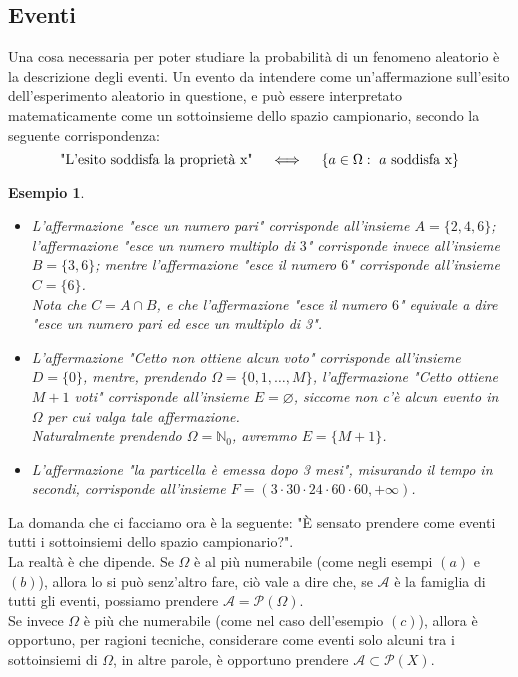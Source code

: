 \documentclass[11pt]{book}
\theoremstyle{Definizione}
\theoremstyle{TeoremaProposizioneLemmaCorollario}
\theoremstyle{OsservazioneNota}
\newtheorem{myes}{Esempio}[section]
\newcommand{\N}{\mathbb{N}}
\newcommand{\parti}[1]{\mathcal{P}\left({#1}\right)}
\begin{document}
\subsection{Eventi}
Una cosa necessaria per poter studiare la probabilità di un fenomeno aleatorio è la descrizione degli eventi. Un evento da intendere come un'affermazione sull'esito dell'esperimento aleatorio in questione, e può essere interpretato matematicamente come un sottoinsieme dello spazio campionario, secondo la seguente corrispondenza:
$$
\textup{"L'esito soddisfa la proprietà x"}\quad \iff \quad \{a\in \Omega:\ a\textup{ soddisfa x}\}
$$
\begin{myes}\hfill
\begin{itemize}
\item[$(a)$] L'affermazione "esce un numero pari" corrisponde all'insieme $A = \{2,4,6\}$; l'affermazione "esce un numero multiplo di $3$" corrisponde invece all'insieme $B = \{3,6\}$; mentre l'affermazione "esce il numero $6$" corrisponde all'insieme $C = \{6\}$.\\
Nota che $C = A\cap B$, e che l'affermazione "esce il numero $6$" equivale a dire "esce un numero pari ed esce un multiplo di 3".
\item[$(b)$] L'affermazione "Cetto non ottiene alcun voto" corrisponde all'insieme $D = \{0\}$, mentre, prendendo $\Omega = \{0,1,\dots,M\}$, l'affermazione "Cetto ottiene $M+1$ voti" corrisponde all'insieme $E = \varnothing$, siccome non c'è alcun evento in $\Omega$ per cui valga tale affermazione.\\
Naturalmente prendendo $\Omega = \N_0$, avremmo $E = \{M+1\}$.
\item[$(c)$] L'affermazione "la particella è emessa dopo 3 mesi", misurando il tempo in secondi, corrisponde all'insieme $F = (3\cdot 30 \cdot 24 \cdot 60 \cdot 60, +\infty)$.
\end{itemize}
\end{myes}
La domanda che ci facciamo ora è la seguente: "È sensato prendere come eventi tutti i sottoinsiemi dello spazio campionario?".\\
La realtà è che dipende. Se $\Omega$ è al più numerabile (come negli esempi $(a)$ e $(b)$), allora lo si può senz'altro fare, ciò vale a dire che, se $\mathcal{A}$ è la famiglia di tutti gli eventi, possiamo prendere $\mathcal{A} = \parti{\Omega}$.\\
Se invece $\Omega$ è più che numerabile (come nel caso dell'esempio $(c)$), allora è opportuno, per ragioni tecniche, considerare come eventi solo alcuni tra i sottoinsiemi di $\Omega$, in altre parole, è opportuno prendere $\mathcal{A}\subset \parti{X}$.
\end{document}
